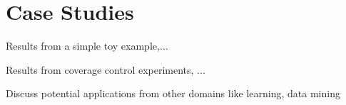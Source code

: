 \documentclass[letterpaper, 10 pt, conference]{ieeeconf}
\newcommand{\R}{\mathbb{R}}
\begin{document}





\section{Case Studies}
\label{Sec:CaseStudies}

Results from a simple toy example,...

Results from coverage control experiments, ...

Discuss potential applications from other domains like learning, data mining 








\end{document}
